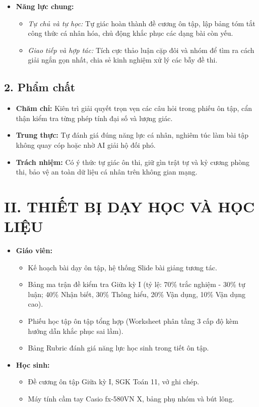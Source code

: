 \documentclass[12pt, a4paper]{article}
\begin{document}
\begin{itemize}[leftmargin=1.2cm]
    \item \textbf{Năng lực chung:}
    \begin{itemize}[leftmargin=0.6cm]
        \item \textit{Tự chủ và tự học:} Tự giác hoàn thành đề cương ôn tập, lập bảng tóm tắt công thức cá nhân hóa, chủ động khắc phục các dạng bài còn yếu.
        \item \textit{Giao tiếp và hợp tác:} Tích cực thảo luận cặp đôi và nhóm để tìm ra cách giải ngắn gọn nhất, chia sẻ kinh nghiệm xử lý các bẫy đề thi.
    \end{itemize}
\end{itemize}

\subsection*{2. Phẩm chất}

\begin{itemize}[leftmargin=1.2cm]
    \item \textbf{Chăm chỉ:} Kiên trì giải quyết trọn vẹn các câu hỏi trong phiếu ôn tập, cẩn thận kiểm tra từng phép tính đại số và lượng giác.
    \item \textbf{Trung thực:} Tự đánh giá đúng năng lực cá nhân, nghiêm túc làm bài tập không quay cóp hoặc nhờ AI giải hộ đối phó.
    \item \textbf{Trách nhiệm:} Có ý thức tự giác ôn thi, giữ gìn trật tự và kỷ cương phòng thi, bảo vệ an toàn dữ liệu cá nhân trên không gian mạng.
\end{itemize}

\section*{II. THIẾT BỊ DẠY HỌC VÀ HỌC LIỆU}

\begin{itemize}[leftmargin=1.2cm]
    \item \textbf{Giáo viên:}
    \begin{itemize}[leftmargin=0.6cm]
        \item Kế hoạch bài dạy ôn tập, hệ thống Slide bài giảng tương tác.
        \item Bảng ma trận đề kiểm tra Giữa kỳ I (tỷ lệ: 70\% trắc nghiệm - 30\% tự luận; 40\% Nhận biết, 30\% Thông hiểu, 20\% Vận dụng, 10\% Vận dụng cao).
        \item Phiếu học tập ôn tập tổng hợp (Worksheet phân tầng 3 cấp độ kèm hướng dẫn khắc phục sai lầm).
        \item Bảng Rubric đánh giá năng lực học sinh trong tiết ôn tập.
    \end{itemize}
    \item \textbf{Học sinh:}
    \begin{itemize}[leftmargin=0.6cm]
        \item Đề cương ôn tập Giữa kỳ I, SGK Toán 11, vở ghi chép.
        \item Máy tính cầm tay Casio fx-580VN X, bảng phụ nhóm và bút lông.
    \end{itemize}
\end{itemize}
\end{document}

